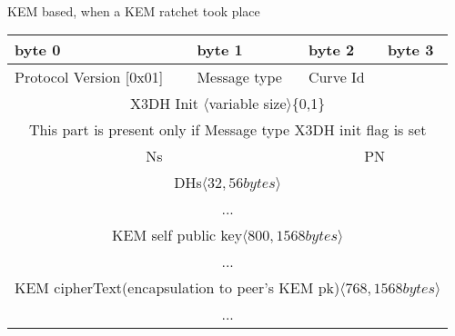 \documentclass[a4paper,11pt]{article}
\begin{document}
      \paragraph*{}KEM based, when a KEM ratchet took place
      \begin{center}
      \begin{tabular}{ | p{1.4in} | p{1.4in} | p{1.4in} | p{1.4in} |}
        \hline
        \cellcolor[gray]{0.85} byte 0 & \cellcolor[gray]{0.85} byte 1 & \cellcolor[gray]{0.85} byte 2 & \cellcolor[gray]{0.85}byte 3\\
        \hline
        Protocol Version [0x01] & Message type & Curve Id & \\
        \cline{1-3}
        \multicolumn{4}{|c|}{X3DH Init $\langle $variable size$\rangle $\{0,1\}}\\
        \multicolumn{4}{|c|}{This part is present only if Message type X3DH init flag is set}\\
        \hline
        \multicolumn{2}{|c}{Ns}&\multicolumn{2}{|c|}{PN}\\
        \hline
        \multicolumn{4}{|c|}{DHs$\langle 32,56 bytes\rangle $}\\
        \multicolumn{4}{|c|}{...}\\
        \hline
        \multicolumn{4}{|c|}{KEM self public key$\langle 800,1568 bytes\rangle $}\\
        \multicolumn{4}{|c|}{...}\\
        \hline
        \multicolumn{4}{|c|}{KEM cipherText(encapsulation to peer's KEM pk)$\langle 768,1568 bytes\rangle $}\\
        \multicolumn{4}{|c|}{...}\\
        \hline


      \end{tabular}
      \end{center}
\end{document}
